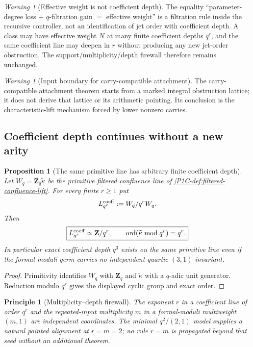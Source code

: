 \documentclass[11pt]{article}
\newtheorem{proposition}[theorem]{Proposition}
\newtheorem{principle}[theorem]{Principle}
\theoremstyle{remark}
\newtheorem{warning}[theorem]{Warning}
\newcommand{\Z}{\mathbf Z}
\providecommand{\Ord}{\operatorname{Ord}}
\renewcommand{\Ord}{\operatorname{ord}}
\begin{document}
\begin{warning}[Effective weight is not coefficient depth]\label{P1C-warn:effective-weight-not-depth}
The equality ``parameter-degree loss $+$ $q$-filtration gain $=$ effective weight'' is a filtration rule
inside the recursive controller, not an identification of jet order with coefficient depth.  A class may
have effective weight $N$ at many finite coefficient depths $q^r$, and the same coefficient line may
deepen in $r$ without producing any new jet-order obstruction.  The support/multiplicity/depth
firewall therefore remains unchanged.
\end{warning}

\begin{warning}[Input boundary for carry-compatible attachment]
\label{P1C-warn:cc-recursion-not-provenance}
The carry-compatible attachment theorem starts from a marked integral obstruction
lattice; it does not derive that lattice or its arithmetic pointing.  Its conclusion
is the characteristic-lift mechanism forced by lower nonzero carries.
\end{warning}

\subsection{Coefficient depth continues without a new arity}

\begin{proposition}[The same primitive line has arbitrary finite coefficient depth]\label{P1C-prop:primitive-line-arbitrary-depth}
Let $W_q=\Z_q\widetilde\kappa$ be the primitive filtered confluence line of \cref{P1C-def:filtered-confluence-lift}.  For every finite $r\ge1$ put
\[
 L^{\rm coeff}_{q^r}:=W_q/q^rW_q.
\]
Then
\[
 \boxed{
 L^{\rm coeff}_{q^r}\simeq\Z/q^r,
 \qquad
 \Ord(\widetilde\kappa\bmod q^r)=q^r.}
\]
In particular exact coefficient depth $q^3$ exists on the same primitive line even if the formal-moduli germ carries no independent quartic $(3,1)$ invariant.
\end{proposition}

\begin{proof}
Primitivity identifies $W_q$ with $\Z_q$ and $\widetilde\kappa$ with a $q$-adic unit generator.  Reduction modulo $q^r$ gives the displayed cyclic group and exact order.
\end{proof}

\begin{principle}[Multiplicity--depth firewall]\label{P1C-prin:multiplicity-depth-firewall}
The exponent $r$ in a coefficient line of order $q^r$ and the repeated-input multiplicity $m$ in a formal-moduli multiweight $(m,1)$ are independent coordinates.  The minimal $q^2/(2,1)$ model supplies a natural pointed alignment at $r=m=2$; no rule $r=m$ is propagated beyond that seed without an additional theorem.
\end{principle}
\end{document}
